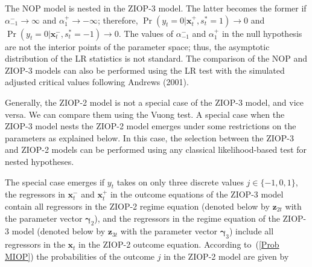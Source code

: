 \documentclass[letterpaper,fleqn,12pt]{article}
\begin{document}
The NOP model is nested in the ZIOP-3 model. The latter becomes the former
if $\alpha _{-1}^{-}\rightarrow \infty $ and $\alpha _{1}^{+}\rightarrow
-\infty $; therefore, $\Pr (y_{t}=0|\mathbf{x}_{t}^{+},s_{t}^{\ast
}=1)\rightarrow 0$ and $\Pr (y_{t}=0|\mathbf{x}_{t}^{-},s_{t}^{\ast
}=-1)\rightarrow 0$. The values of $\alpha _{-1}^{-}$ and $\alpha _{1}^{+}$
in the null hypothesis are not the interior points of the parameter space;
thus, the asymptotic distribution of the LR statistics is not standard. The
comparison of the NOP and ZIOP-3 models can also be performed using the LR
test with the simulated adjusted critical values following Andrews (2001).

Generally, the ZIOP-2 model is not a special case of the ZIOP-3 model, and
vice versa. We can compare them using the Vuong test. A special case when
the ZIOP-3 model nests the ZIOP-2 model emerges under some restrictions on
the parameters as explained below. In this case, the selection between the
ZIOP-3 and ZIOP-2 models can be performed using any classical
likelihood-based test for nested hypotheses.

The special case emerges if $y_{t}$ takes on only three discrete values $%
j\in \{-1,0,1\}$, the regressors in $\mathbf{x}_{t}^{-}$ and $\mathbf{x}%
_{t}^{+}$ in the outcome equations of the ZIOP-3 model contain all
regressors in the ZIOP-2 regime equation (denoted below by $\mathbf{z}_{2t}$
with the parameter vector $\mathbf{\gamma }_{2}$), and the regressors in the
regime equation of the ZIOP-3 model (denoted below by $\mathbf{z}_{3t}$ with
the parameter vector $\mathbf{\gamma }_{3}$) include all regressors in the $%
\mathbf{x}_{t}$ in the ZIOP-2 outcome equation. According to\ (\ref{Prob
MIOP}) the probabilities of the outcome $j$ in the ZIOP-2 model are given by
\end{document}
